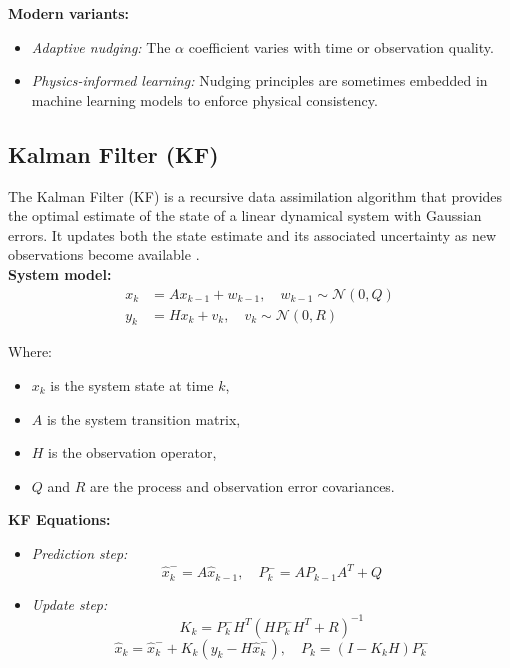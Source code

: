 \documentclass[a4paper]{article}
\begin{document}
\textbf{Modern variants:}\\

\begin{itemize}
  \item \textit{Adaptive nudging:} The $\alpha$ coefficient varies with time or observation quality.
  \item \textit{Physics-informed learning:} Nudging principles are sometimes embedded in machine learning models to enforce physical consistency.
\end{itemize}


\subsection{Kalman Filter (KF)}

The Kalman Filter (KF) is a recursive data assimilation algorithm that provides the optimal estimate of the state 
of a linear dynamical system with Gaussian errors. It updates both the state estimate and its associated uncertainty 
as new observations become available \parencite{kalman1960new, kalnay2003atmospheric}.\\

\textbf{System model:}\\

\begin{align}
x_{k} &= A x_{k-1} + w_{k-1}, \quad w_{k-1} \sim \mathcal{N}(0, Q) \\
y_{k} &= H x_{k} + v_{k}, \quad v_{k} \sim \mathcal{N}(0, R)
\end{align}

Where:\\

\begin{itemize}
  \item $x_k$ is the system state at time $k$,
  \item $A$ is the system transition matrix,
  \item $H$ is the observation operator,
  \item $Q$ and $R$ are the process and observation error covariances.
\end{itemize}

\textbf{KF Equations:}\\

\begin{itemize}
  \item \textit{Prediction step:}
    \[
    \hat{x}_{k}^{-} = A \hat{x}_{k-1}, \quad P_k^{-} = A P_{k-1} A^T + Q
    \]
  \item \textit{Update step:}
    \[
    K_k = P_k^{-} H^T (H P_k^{-} H^T + R)^{-1}
    \]
    \[
    \hat{x}_{k} = \hat{x}_k^{-} + K_k (y_k - H \hat{x}_k^{-}), \quad P_k = (I - K_k H) P_k^{-}
    \]
\end{itemize}
\end{document}
